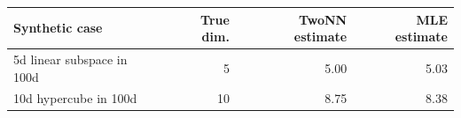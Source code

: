 \begin{tabular}{lrrr}
\toprule
Synthetic case & True dim. & TwoNN estimate & MLE estimate \\
\midrule
5d linear subspace in 100d & 5 & 5.00 & 5.03 \\
10d hypercube in 100d & 10 & 8.75 & 8.38 \\
\bottomrule
\end{tabular}
